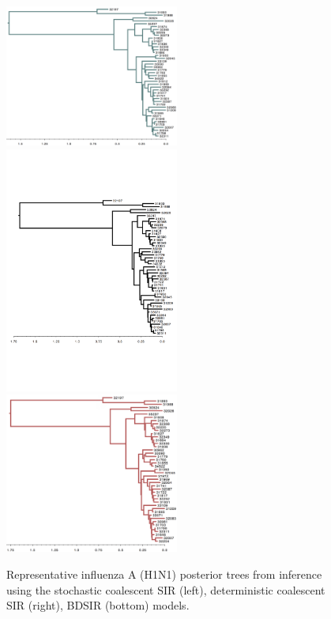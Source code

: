 \documentclass[10pt]{article}
\newcommand{\stochCoalSIR}{stochastic coalescent SIR}
\newcommand{\deterCoalSIR}{deterministic coalescent SIR}
\newcommand{\BDSIR}{BDSIR}
\begin{document}
\begin{figure}[ht]
    \centering
{%
    	\includegraphics[width=2.25in]{H1N1_stochSIR_fluTree2.png}
}
\quad
{%
    	\includegraphics[width=2.25in]{H1N1_deterSIR_fluTree2.png}
}
\quad
{%
    	\includegraphics[width=2.25in]{H1N1_BDSIR_fluTree2.png}
}
\caption{Representative influenza A (H1N1) posterior trees from inference using the \stochCoalSIR{} (left), \deterCoalSIR{} (right), \BDSIR{} (bottom) models.
}
\end{figure}
%
%
\end{document}
